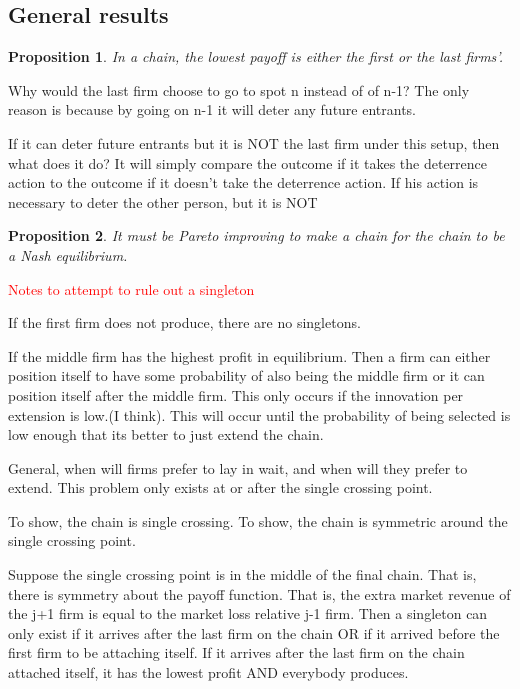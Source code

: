 \documentclass{article}
\newtheorem{proposition}{Proposition}
\begin{document}
\subsection{General results}

\begin{proposition}
In a chain, the lowest payoff is either the first or the last firms'. 
\end{proposition}

Why would the last firm choose to go to spot n instead of of n-1? The only reason is because by going on n-1 it will deter any future entrants. 

If it can deter future entrants but it is NOT the last firm under this setup, then what does it do? It will simply compare the outcome if it takes the deterrence action to the outcome if it doesn't take the deterrence action. If his action is necessary to deter the other person, but it is NOT 

\begin{proposition}
It must be Pareto improving to make a chain for the chain to be a Nash equilibrium. 
\end{proposition}


\textcolor{red}{Notes to attempt to rule out a singleton}

If the first firm does not produce, there are no singletons. 

If the middle firm has the highest profit in equilibrium. Then a firm can either position itself to have some probability of also being the middle firm or it can position itself after the middle firm. This only occurs if the innovation per extension is low.(I think). This will occur until the probability of being selected is low enough that its better to just extend the chain. 

General, when will firms prefer to lay in wait, and when will they prefer to extend. This problem only exists at or after the single crossing point. 

To show, the chain is single crossing. 
To show, the chain is symmetric around the single crossing point. 

Suppose the single crossing point is in the middle of the final chain. That is, there is symmetry about the payoff function. That is, the extra market revenue of the j+1 firm is equal to the market loss relative j-1 firm. Then a singleton can only exist if it arrives after the last firm on the chain OR if it arrived before the first firm to be attaching itself. If it arrives after the last firm on the chain attached itself, it has the lowest profit AND everybody produces. 
\end{document}
